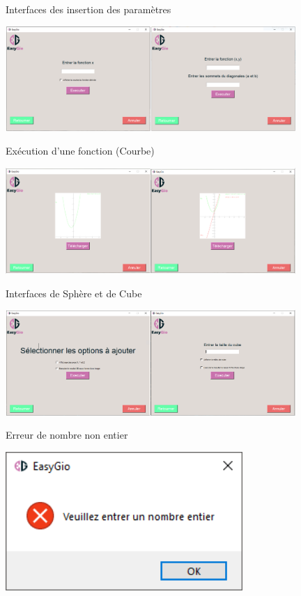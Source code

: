 \documentclass{beamer}
\begin{document}
\begin{frame}{Interfaces des insertion des paramètres}
\begin{center}
    \includegraphics[width=11cm]{pic/InputesInter.PNG}
\end{center}
\end{frame}
\begin{frame}{Exécution d'une fonction (Courbe)}
\begin{center}
    \includegraphics[width=11cm]{pic/Fonction.PNG}
\end{center}
\end{frame}
\begin{frame}{Interfaces de Sphère et de Cube}
\begin{center}
    \includegraphics[width=11cm]{pic/SpCube.PNG}
\end{center}
\end{frame}
\begin{frame}{Erreur de nombre non entier}
\begin{center}
    \includegraphics[width=9cm]{pic/NbError.PNG}
\end{center}
\end{frame}
\end{document}
